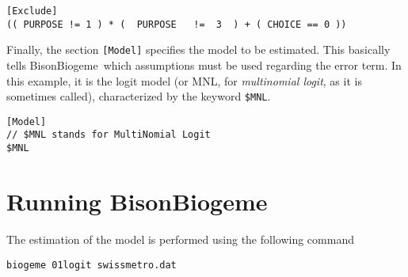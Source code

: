 \documentclass[12pt,a4paper]{article}
\newcommand{\BBIOGEME}{BisonBiogeme}
\begin{document}
\begin{lstlisting}[style=nonumbers]
[Exclude]
(( PURPOSE != 1 ) * (  PURPOSE   !=  3  ) + ( CHOICE == 0 )) 
\end{lstlisting}

Finally, the section \lstinline$[Model]$ specifies the model to be
estimated. This basically tells \BBIOGEME\  which assumptions must
be used regarding the error term. In this example, it is the logit
model (or MNL, for \emph{multinomial logit}, as it is sometimes
called), characterized by the keyword \lstinline&$MNL&.


\begin{lstlisting}[style=nonumbers]
[Model]
// $MNL stands for MultiNomial Logit 
$MNL
\end{lstlisting}


\section{Running \BBIOGEME}

The estimation of the model is performed using the following command 
\begin{lstlisting}
biogeme 01logit swissmetro.dat
\end{lstlisting}
\end{document}
